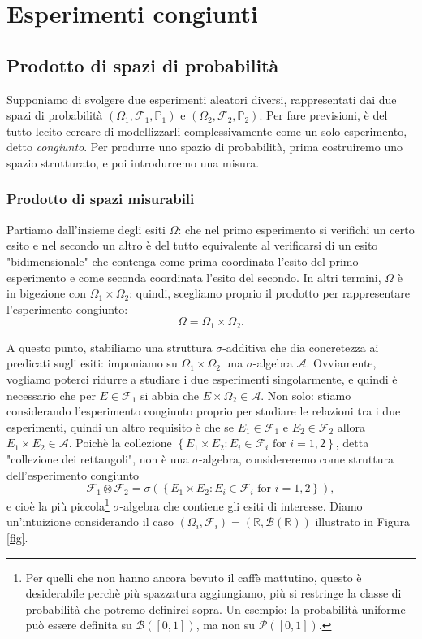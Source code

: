 
\chapter{Esperimenti congiunti}

\section{Prodotto di spazi di probabilità}

Supponiamo di svolgere due esperimenti aleatori diversi, rappresentati dai due spazi di probabilità $\left( \Omega_1, \mathcal{F}_1, \mathbb{P}_1 \right)$ e $\left( \Omega_2, \mathcal{F}_2, \mathbb{P}_2 \right)$. 
Per fare previsioni, è del tutto lecito cercare di modellizzarli complessivamente come un solo esperimento, detto \textit{congiunto}. Per produrre uno spazio di probabilità, prima costruiremo uno spazio strutturato, e poi introdurremo una misura. 

\subsection{Prodotto di spazi misurabili}
Partiamo dall'insieme degli esiti $\Omega$: che nel primo esperimento si verifichi un certo esito e nel secondo un altro è del tutto equivalente al verificarsi di un esito "bidimensionale" che contenga come prima coordinata l'esito del primo esperimento e come seconda coordinata l'esito del secondo. 
In altri termini, $\Omega$ è in bigezione con $\Omega_1 \times \Omega_2$: quindi, scegliamo proprio il prodotto per rappresentare l'esperimento congiunto:
\[
	\Omega = \Omega_1 \times \Omega_2.	
\]

A questo punto, stabiliamo una struttura $\sigma$-additiva che dia concretezza ai predicati sugli esiti: imponiamo su $\Omega_1 \times \Omega_2$ una $\sigma$-algebra $\mathcal{A}$.
Ovviamente, vogliamo poterci ridurre a studiare i due esperimenti singolarmente, e quindi è necessario che per $E \in \mathcal{F}_1$ si abbia che $E \times \Omega_2 \in \mathcal{A}$. 
Non solo: stiamo considerando l'esperimento congiunto proprio per studiare le relazioni tra i due esperimenti, quindi un altro requisito è che se $E_1 \in \mathcal{F}_1$ e $E_2 \in \mathcal{F}_2$ allora $E_1 \times E_2 \in \mathcal{A}$. 
Poichè la collezione $\left\{ E_1 \times E_2 : E_i \in \mathcal{F}_i \text{ for } i=1,2 \right\}$, detta "collezione dei rettangoli", non è una $\sigma$-algebra, considereremo come struttura dell'esperimento congiunto
\[
	\mathcal{F}_1 \otimes \mathcal{F}_2 = \sigma \left( \left\{ E_1 \times E_2 : E_i \in \mathcal{F}_i \text{ for } i=1,2 \right\} \right),
\]
e cioè la più piccola\footnote{Per quelli che non hanno ancora bevuto il caffè mattutino, questo è desiderabile perchè più spazzatura aggiungiamo, più si restringe la classe di probabilità che potremo definirci sopra.
Un esempio: la probabilità uniforme può essere definita su $\mathcal{B}([0,1])$, ma non su $\mathcal{P}([0,1])$.} $\sigma$-algebra che contiene gli esiti di interesse. Diamo un'intuizione considerando il caso $\left( \Omega_i, \mathcal{F}_i \right) = \left( \mathbb{R}, \mathcal{B}(\mathbb{R}) \right)$ illustrato in Figura \ref{fig}. 

